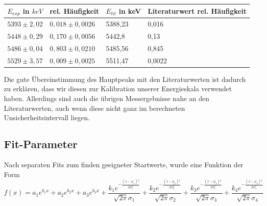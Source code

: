 \documentclass[bigchapter,colorback,accentcolor=tud4b,linedtoc,11pt]{tudreport}
\begin{document}
\color{blue}
\begin{center}
  \begin{tabular}{l|l|l|l}
    $E_{exp}$ in $keV$ & rel. Häufigkeit    & $E_{lit}$ in keV & Literaturwert rel. Häufigkeit \\ \hline
    $5393 \pm 2,02$    & $0,018 \pm 0,0026$ & 5388,23          & 0,016                         \\
    $5448 \pm 0,29$    & $0,170 \pm 0,0056$ & 5442,8           & 0,13                          \\
    $5486 \pm 0,04$    & $0,803 \pm 0,0210$ & 5485,56          & 0,845                         \\
    $5529 \pm 3,57$    & $0,009 \pm 0,0025$ & 5511,47          & 0,0022                        \\
  \end{tabular}
\end{center}
\color{black}

Die gute Übereinstimmung des Hauptpeaks mit den Literaturwerten ist dadurch zu
erklären, dass wir diesen zur Kalibration unserer Energieskala verwendet
haben. Allerdings sind auch die übrigen Messergebnisse nahe an den
Literaturwerten, auch wenn diese nicht ganz im berechneten Unsicherheitsintervall liegen.


\subsection{Fit-Parameter}
Nach separaten Fits zum finden geeigneter Startwerte, wurde eine Funktion der
Form
$$f(x)=a_1 e^{b_1 x}+a_2 e^{b_2 x}+a_3 e^{b_3 x}+\frac{k_1 e^{-\frac{\left(x-\mu _1\right){}^2}{2 \sigma _1^2}}}{\sqrt{2 \pi } \sigma _1}+\frac{k_2 e^{-\frac{\left(x-\mu _2\right){}^2}{2 \sigma _2^2}}}{\sqrt{2 \pi } \sigma _2}+\frac{k_3 e^{-\frac{\left(x-\mu _3\right){}^2}{2 \sigma _3^2}}}{\sqrt{2 \pi } \sigma _3}+\frac{k_4 e^{-\frac{\left(x-\mu _4\right){}^2}{2 \sigma _4^2}}}{\sqrt{2 \pi } \sigma _4}$$
\end{document}
